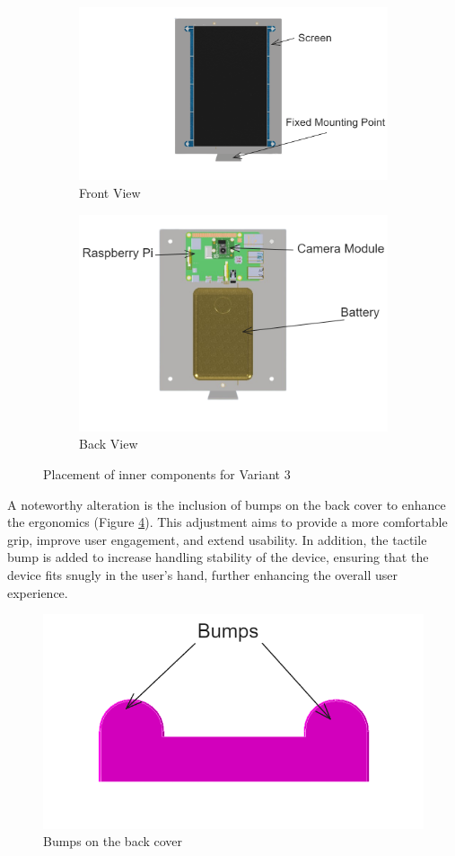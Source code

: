 \begin{figure}[!ht]
    \centering
    \begin{subfigure}[c]{0.47\textwidth}
        \begin{minipage}{\textwidth}
            \centering
            \includegraphics[height=3.8 cm]{texs/Part1/chapter4/image/v32.png}
        \end{minipage}
        \caption{Front View}
        \label{fig:variant3_front_components}
    \end{subfigure}
    \begin{subfigure}[c]{0.47\textwidth}
        \begin{minipage}{\textwidth}
            \centering
            \includegraphics[height=3.8 cm]{texs/Part1/chapter4/image/v33.png}
        \end{minipage}
        \caption{Back View}
        \label{fig:variant3_back_components}
    \end{subfigure}
    \caption{Placement of inner components for Variant 3}
    \label{fig:variant3_inner_components}
\end{figure}

A noteworthy alteration is the inclusion of bumps on the back cover to enhance the ergonomics (Figure \ref{fig:variant3_bumps}). This adjustment aims to provide a more comfortable grip, improve user engagement, and extend usability. In addition, the tactile bump is added to increase handling stability of the device, ensuring that the device fits snugly in the user's hand, further enhancing the overall user experience.

\begin{figure}[!ht]
    \centering
    \includegraphics[width=0.5\linewidth]{texs/Part1/chapter4/image/v34.png}
    \caption{Bumps on the back cover}
    \label{fig:variant3_bumps}
\end{figure}

